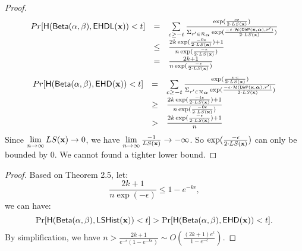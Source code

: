 \documentclass{article}
\begin{document}
\begin{proof}
\[\begin{array}{lcl}
	Pr[\mathsf{H}(\mathsf{Beta}(\alpha, \beta), \mathsf{EHDL}(\textbf{x})) < t] 
	& =  & \sum\limits_{c \geq - t}
	\frac
  	{\exp(\frac{c\epsilon}{2\cdot LS(\textbf{x})})}
	{\Sigma_{r' \in \mathcal{R}_{\boldsymbol{\alpha}}}\exp(\frac{-\epsilon\cdot \mathcal{H}(\mathsf{DirP}(\textbf{x},\boldsymbol{\alpha}), r')}{2\cdot LS(\textbf{x})})}\\
 	& \leq &
 	\frac
  	{2k\exp(\frac{-0\epsilon }{2\cdot LS(\textbf{x})}) + 1}
	{n\exp(\frac{-\epsilon }{2\cdot LS(\textbf{x})})}\\
 	& = &
 	\frac
  	{2k + 1}
	{n\exp(\frac{-\epsilon }{2\cdot LS(\textbf{x})})}
\end{array}
\]
\[
	\begin{array}{lcl}
	Pr[\mathsf{H}(\mathsf{Beta}(\alpha, \beta), \mathsf{EHD}(\textbf{x})) < t] 
	& =  & \sum\limits_{c \geq - t}
	\frac
  {\exp(\frac{\epsilon\cdot c}{2\cdot LS(\textbf{x})})}
{\Sigma_{r' \in \mathcal{R}_{\boldsymbol{\alpha}}}\exp(\frac{-\epsilon\cdot \mathcal{H}(\mathsf{DirP}(\textbf{x},\boldsymbol{\alpha}), r')}{2\cdot LS(\textbf{x})})}\\
 	& \geq &
 	\frac
  	{2k\exp(\frac{-t\epsilon }{2\cdot LS(\textbf{x})}) + 1}
	{n\exp(\frac{-0\epsilon }{2\cdot LS(\textbf{x})})}\\
 	& > &
 	\frac
  	{2k\exp(\frac{-\epsilon }{2\cdot LS(\textbf{x})}) + 1}
	{n}
\end{array}
\]
Since $\lim\limits_{n \rightarrow \infty} LS(\textbf{x}) \rightarrow 0$, 
we have $\lim\limits_{n \rightarrow \infty}\frac{-1}{LS(\textbf{x})} \rightarrow -\infty$. So $\exp(\frac{-\epsilon }{2\cdot LS(\textbf{x})})$ can only be bounded by $0$. We cannot found a tighter lower bound.
%
\end{proof}
%
%
\begin{proof}
Based on Theorem 2.5, let:
\[
	\frac
  	{2k+1}
	{n\exp(-\epsilon)} \leq 1 - e^{-k\epsilon},
\]
we can have:
\[
	\Pr[\mathsf{H}(\mathsf{Beta}(\alpha, \beta), \mathsf{LSHist}(\textbf{x}))< t]
	> 
	\Pr[\mathsf{H}(\mathsf{Beta}(\alpha, \beta), \mathsf{EHD}(\textbf{x}))< t].
\]
By simplification, we have $n > \frac{2k + 1}{e^{-\epsilon}(1 - e^{-k\epsilon})} \sim O(\frac{(2k + 1 )e^{\epsilon}}{1 - e^{-\epsilon}})$.
\end{proof}
\end{document}
